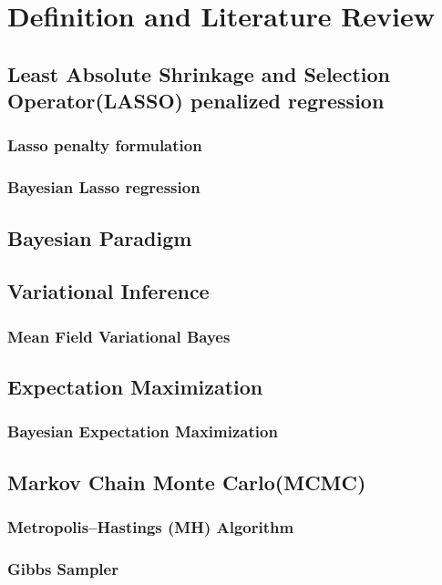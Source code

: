 \chapter{Definition and Literature Review}
\label{Chapter2}
\section{Least Absolute Shrinkage and Selection Operator(LASSO) penalized regression}
\subsection{Lasso penalty formulation}
\subsection{Bayesian Lasso regression}

\section{Bayesian Paradigm}
\section{Variational Inference}
\subsection{Mean Field Variational Bayes}

\section{Expectation Maximization}
\subsection{Bayesian Expectation Maximization}

\section{Markov Chain Monte Carlo(MCMC)}
\subsection{Metropolis–Hastings (MH) Algorithm}
\subsection{Gibbs Sampler}







